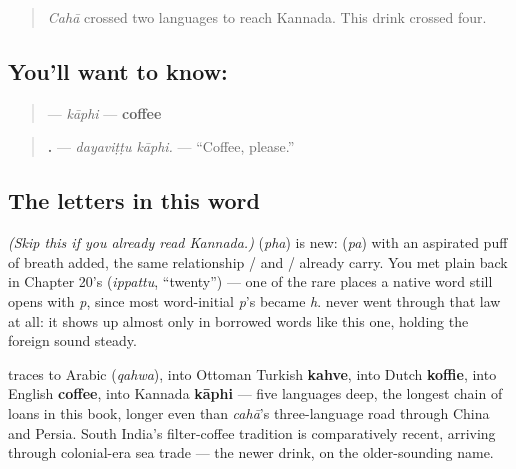 \label{lesson:KA-C39-kaapi}



\begin{quote}
\emph{Cahā} crossed two languages to reach Kannada. This drink crossed four.
\end{quote}

\subsection*{You'll want to know: }
\begin{quote}
\textbf{} — \emph{kāphi} — \textbf{coffee}
\end{quote}

\begin{quote}
\textbf{ .} — \emph{dayaviṭṭu kāphi.} — \textquotedblleft{}Coffee, please.\textquotedblright{}
\end{quote}

\subsection*{The letters in this word}
\emph{(Skip this if you already read Kannada.)} \textbf{} (\emph{pha}) is new: \textbf{} (\emph{pa}) with an aspirated puff of breath added, the same relationship \textbf{}/\textbf{} and \textbf{}/\textbf{} already carry. You met plain \textbf{} back in Chapter 20's \textbf{} (\emph{ippattu}, \textquotedblleft{}twenty\textquotedblright{}) — one of the rare places a native word still opens with \emph{p}, since most word-initial \emph{p}'s became \emph{h}. \textbf{} never went through that law at all: it shows up almost only in borrowed words like this one, holding the foreign sound steady.

\begin{cousinweb}
\textbf{} traces to Arabic \textbf{} (\emph{qahwa}), into Ottoman Turkish \textbf{kahve}, into Dutch \textbf{koffie}, into English \textbf{coffee}, into Kannada \textbf{kāphi} — five languages deep, the longest chain of loans in this book, longer even than \emph{cahā}'s three-language road through China and Persia. South India's filter-coffee tradition is comparatively recent, arriving through colonial-era sea trade — the newer drink, on the older-sounding name.
\end{cousinweb}

